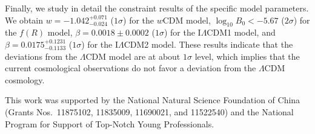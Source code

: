 \documentclass[aps,prd,nofootinbib,amsmath,amssymb,twocolumn,superscriptaddress,10pt]{revtex4}%
\begin{document}
Finally, we study in detail the constraint results of the specific model parameters. {We obtain $w=-1.042^{+0.071}_{-0.024}$ ($1\sigma$) for the $w$CDM model, $\log_{10}B_{0}<-5.67$ ($2\sigma$) for the $f(R)$ model, $\beta=0.0018\pm0.0002$ ($1\sigma$) for the I$\Lambda$CDM1 model, and $\beta=0.0175^{+0.1231}_{-0.1133}$ ($1\sigma$) for the I$\Lambda$CDM2 model. These results indicate that the deviations from the $\Lambda$CDM model are at about $1\sigma$ level, which implies that the current cosmological observations do not favor a deviation from the $\Lambda$CDM cosmology.}




\acknowledgments

This work was supported by the National Natural Science Foundation of China (Grants Nos.~11875102, 11835009, 11690021, and 11522540) and the National Program for Support of Top-Notch Young Professionals.
\end{document}
